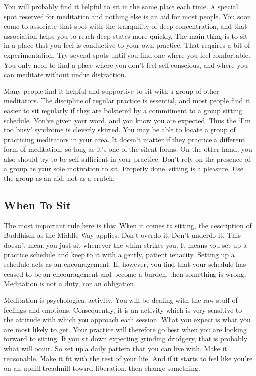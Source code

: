 You will probably find it helpful to sit in the same place each time. A special
spot reserved for meditation and nothing else is an aid for most people. You
soon come to associate that spot with the tranquility of deep concentration, and
that association helps you to reach deep states more quickly. The main thing is
to sit in a place that you feel is conductive to your own practice. That
requires a bit of experimentation. Try several spots until you find one where
you feel comfortable. You only need to find a place where you don't feel
self-conscious, and where you can meditate without undue distraction.

Many people find it helpful and supportive to sit with a group of other
meditators. The discipline of regular practice is essential, and most people
find it easier to sit regularly if they are bolstered by a commitment to a group
sitting schedule. You've given your word, and you know you are expected. Thus
the `I'm too busy' syndrome is cleverly skirted. You may be able to locate a
group of practicing meditators in your area. It doesn't matter if they practice
a different form of meditation, so long as it's one of the silent forms. On the
other hand, you also should try to be self-sufficient in your practice. Don't
rely on the presence of a group as your sole motivation to sit. Properly done,
sitting is a pleasure. Use the group as an aid, not as a crutch.

\subsection*{When To Sit}
The most important rule here is this: When it comes to sitting, the
description of Buddhism as the Middle Way applies. Don't overdo it. Don't
underdo it. This doesn't mean you just sit whenever the whim strikes you. It
means you set up a practice schedule and keep to it with a gently, patient
tenacity. Setting up a schedule acts as an encouragement. If, however, you find
that your schedule has ceased to be an encouragement and become a burden, then
something is wrong. Meditation is not a duty, nor an obligation.

Meditation is psychological activity. You will be dealing with the raw stuff of
feelings and emotions. Consequently, it is an activity which is very sensitive
to the attitude with which you approach each session. What you expect is what
you are most likely to get. Your practice will therefore go best when you are
looking forward to sitting. If you sit down expecting grinding drudgery, that is
probably what will occur. So set up a daily pattern that you can live with. Make
it reasonable. Make it fit with the rest of your life. And if it starts to feel
like you're on an uphill treadmill toward liberation, then change something.

